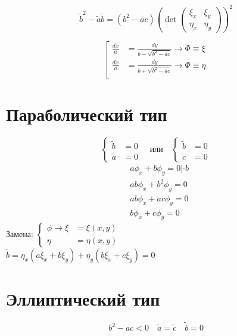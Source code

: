 \documentclass[a4paper]{article}
\begin{document}
\[
    \tilde{b}^2 - \tilde{a}\tilde{b} = (b^2-ac)\left(\det
        \begin{pmatrix}
            \xi_x & \xi_y \\
            \eta_x & \eta_y
        \end{pmatrix}
    \right)^2
\]

\begin{equation}
   \left[
       \begin{array}{ll}
           \frac{dx}{a} &= \frac{dy}{b-\sqrt{b^2-ac}} \to \Phi \equiv \xi \\
           \frac{dx}{a} &= \frac{dy}{b+\sqrt{b^2-ac}} \to \Phi \equiv \eta \\
       \end{array}
   \right .
\end{equation}

\section*{\centering Параболический тип}
\[
    \begin{cases}
        \tilde{b} &= 0 \\
        \tilde{a} &= 0
    \end{cases}
    \quad\text{или} \quad
    \begin{cases}
        \tilde{b} &= 0 \\
        \tilde{c} &= 0
    \end{cases}
\]
\[
    \begin{aligned}
        &a\phi_x + b\phi_y = 0 | \cdot b \\
        &ab\phi_x + b^2\phi_y = 0 \\
        &ab\phi_x + ac\phi_y = 0 \\
        &b\phi_x + c\phi_y = 0
    \end{aligned}
\]
Замена:
$
\begin{cases}
    \phi \to \xi &= \xi(x,y) \\
    \eta &= \eta(x,y)
\end{cases}
$ \\
$ \tilde{b} = \eta_x(a\xi_x + b\xi_y) + \eta_y(b\xi_x + c\xi_y) = 0 $

\section*{\centering Эллиптический тип}
\[ b^2 - ac < 0 \quad \tilde{a}=\tilde{c} \quad \tilde{b} = 0 \]
\end{document}
